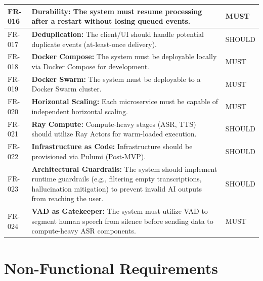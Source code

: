 \begin{longtable}{|l|p{10cm}|l|}
FR-016 & \textbf{Durability:} The system must resume processing after a restart without losing queued events. & MUST \\ \hline
FR-017 & \textbf{Deduplication:} The client/UI should handle potential duplicate events (at-least-once delivery). & SHOULD \\ \hline
FR-018 & \textbf{Docker Compose:} The system must be deployable locally via Docker Compose for development. & MUST \\ \hline
FR-019 & \textbf{Docker Swarm:} The system must be deployable to a Docker Swarm cluster. & MUST \\ \hline
FR-020 & \textbf{Horizontal Scaling:} Each microservice must be capable of independent horizontal scaling. & MUST \\ \hline
FR-021 & \textbf{Ray Compute:} Compute-heavy stages (ASR, TTS) should utilize Ray Actors for warm-loaded execution. & SHOULD \\ \hline
FR-022 & \textbf{Infrastructure as Code:} Infrastructure should be provisioned via Pulumi (Post-MVP). & SHOULD \\ \hline
FR-023 & \textbf{Architectural Guardrails:} The system should implement runtime guardrails (e.g., filtering empty transcriptions, hallucination mitigation) to prevent invalid AI outputs from reaching the user. & SHOULD \\ \hline
FR-024 & \textbf{VAD as Gatekeeper:} The system must utilize VAD to segment human speech from silence before sending data to compute-heavy ASR components. & MUST \\ \hline
\end{longtable}

\section{Non-Functional Requirements}

